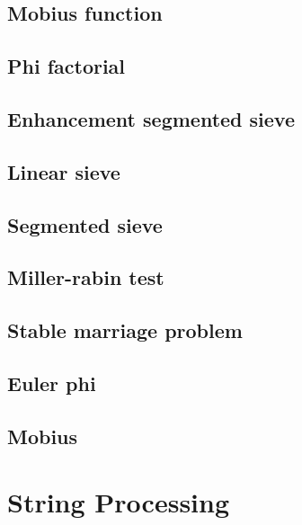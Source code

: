 \subsection{Mobius function}
\raggedbottom
\hrulefill
\subsection{Phi factorial}
\raggedbottom
\hrulefill
\subsection{Enhancement segmented sieve}
\raggedbottom
\hrulefill
\subsection{Linear sieve}
\raggedbottom
\hrulefill
\subsection{Segmented sieve}
\raggedbottom
\hrulefill
\subsection{Miller-rabin test}
\raggedbottom
\hrulefill
\subsection{Stable marriage problem}
\raggedbottom
\hrulefill
\subsection{Euler phi}
\raggedbottom
\hrulefill
\subsection{Mobius}
\raggedbottom
\hrulefill


\section{String Processing}
